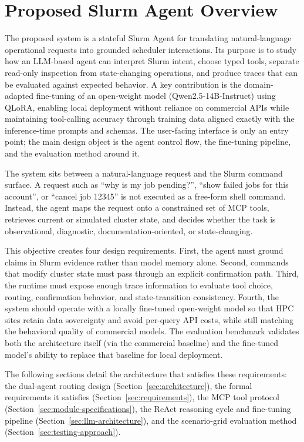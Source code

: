 \section{Proposed Slurm Agent Overview}
\label{sec:app-introduction}

The proposed system is a stateful Slurm Agent for translating natural-language operational requests into grounded scheduler interactions. Its purpose is to study how an LLM-based agent can interpret Slurm intent, choose typed tools, separate read-only inspection from state-changing operations, and produce traces that can be evaluated against expected behavior. A key contribution is the domain-adapted fine-tuning of an open-weight model (Qwen2.5-14B-Instruct) using QLoRA, enabling local deployment without reliance on commercial APIs while maintaining tool-calling accuracy through training data aligned exactly with the inference-time prompts and schemas. The user-facing interface is only an entry point; the main design object is the agent control flow, the fine-tuning pipeline, and the evaluation method around it.

The system sits between a natural-language request and the Slurm command surface. A request such as ``why is my job pending?'', ``show failed jobs for this account'', or ``cancel job 12345'' is not executed as a free-form shell command. Instead, the agent maps the request onto a constrained set of MCP tools, retrieves current or simulated cluster state, and decides whether the task is observational, diagnostic, documentation-oriented, or state-changing.

This objective creates four design requirements. First, the agent must ground claims in Slurm evidence rather than model memory alone. Second, commands that modify cluster state must pass through an explicit confirmation path. Third, the runtime must expose enough trace information to evaluate tool choice, routing, confirmation behavior, and state-transition consistency. Fourth, the system should operate with a locally fine-tuned open-weight model so that HPC sites retain data sovereignty and avoid per-query API costs, while still matching the behavioral quality of commercial models. The evaluation benchmark validates both the architecture itself (via the commercial baseline) and the fine-tuned model's ability to replace that baseline for local deployment.

The following sections detail the architecture that satisfies these requirements: the dual-agent routing design (Section~\ref{sec:architecture}), the formal requirements it satisfies (Section~\ref{sec:requirements}), the MCP tool protocol (Section~\ref{sec:module-specifications}), the ReAct reasoning cycle and fine-tuning pipeline (Section~\ref{sec:llm-architecture}), and the scenario-grid evaluation method (Section~\ref{sec:testing-approach}).